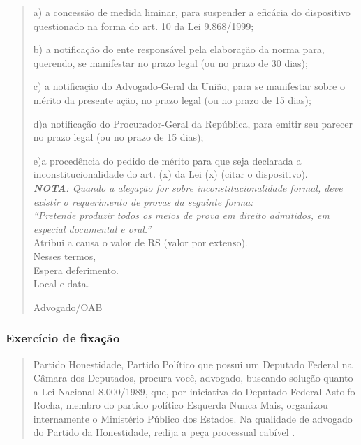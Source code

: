 \documentclass{article}
\begin{document}
\begin{quote}
a) a concessão de medida liminar, para suspender a eficácia do dispositivo questionado na forma do art. 10 da Lei 9.868/1999;

b) a notificação do ente responsável pela elaboração da norma para, querendo, se manifestar no prazo legal (ou no prazo de 30 dias);

c) a notificação do Advogado-Geral da União, para se manifestar sobre o mérito da presente ação, no prazo legal (ou no prazo de 15 dias);

d)a notificação do Procurador-Geral da República, para emitir seu parecer no prazo legal (ou no prazo de 15 dias);

e)a procedência do pedido de mérito para que seja declarada a inconstitucionalidade do art. (x) da Lei (x) (citar o dispositivo).\\

\textit{\textbf{NOTA}: Quando a alegação for sobre inconstitucionalidade formal, deve existir o requerimento de provas da seguinte forma:}\\

\textit{“Pretende produzir todos os meios de prova em direito admitidos, em especial documental e oral.”}\\

Atribui a causa o valor de RS (valor por extenso).\\

Nesses termos,\\

Espera deferimento.\\

 

Local e data.

Advogado/OAB\\
\cite[n. p.]{padilha_oab_2015}
\end{quote}

\subsubsection{Exercício de fixação}

\begin{quote}
    Partido Honestidade, Partido Político que possui um Deputado Federal na Câmara dos Deputados, procura você, advogado, buscando solução quanto a Lei Nacional 8.000/1989, que, por iniciativa do Deputado Federal Astolfo Rocha, membro do partido político Esquerda Nunca Mais, organizou internamente o Ministério Público dos Estados. Na qualidade de advogado do Partido da Honestidade, redija a peça processual cabível \cite{padilha_oab_2015}.
\end{quote}

\printbibliography
\end{document}
